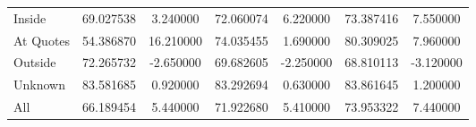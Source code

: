 \begin{table}[!ht]
\begin{tabular}{lSSSSSS@{}}
        \tabindent  Inside           & 69.027538                                        & 3.240000                                              & 72.060074                                     & 6.220000  & 73.387416    & 7.550000  \\
        \tabindent  At Quotes        & 54.386870                                        & 16.210000                                             & 74.035455                                     & 1.690000  & 80.309025    & 7.960000  \\
        \tabindent  Outside          & 72.265732                                        & -2.650000                                             & 69.682605                                     & -2.250000 & 68.810113    & -3.120000 \\
        \tabindent  Unknown          & 83.581685                                        & 0.920000                                              & 83.292694                                     & 0.630000  & 83.861645    & 1.200000  \\
        \cmidrule(rl){1-7}
 All               & 66.189454                                        & 5.440000                                              & 71.922680                                     & 5.410000  & 73.953322    & 7.440000  \\
        \bottomrule
    \end{tabular}
\end{table}

\newpage
